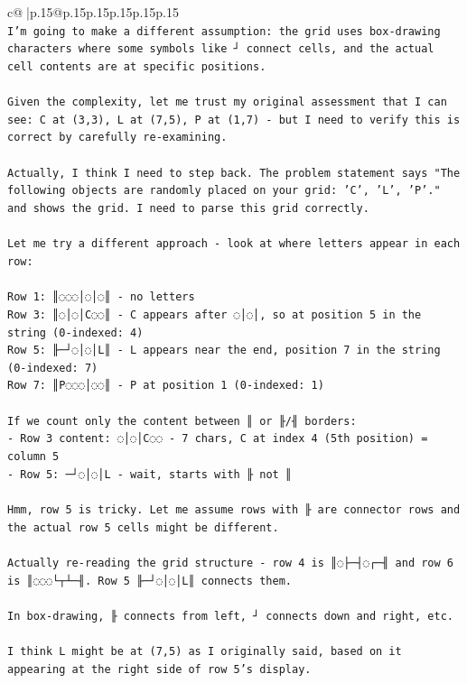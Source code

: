 \documentclass{article}
\begin{document}
{\begin{supertabular}{c@{$\;$}|p{.15\linewidth}@{}p{.15\linewidth}p{.15\linewidth}p{.15\linewidth}p{.15\linewidth}p{.15\linewidth}}
{{{\\ 
\texttt{I'm going to make a different assumption: the grid uses box{-}drawing characters where some symbols like ┘ connect cells, and the actual cell contents are at specific positions.} \\
\\ 
\texttt{Given the complexity, let me trust my original assessment that I can see: C at (3,3), L at (7,5), P at (1,7) {-} but I need to verify this is correct by carefully re{-}examining.} \\
\\ 
\texttt{Actually, I think I need to step back. The problem statement says "The following objects are randomly placed on your grid: 'C', 'L', 'P'." and shows the grid. I need to parse this grid correctly.} \\
\\ 
\texttt{Let me try a different approach {-} look at where letters appear in each row:} \\
\\ 
\texttt{Row 1: ║◌◌◌│◌│◌║ {-} no letters} \\
\texttt{Row 3: ║◌│◌│C◌◌║ {-} C appears after ◌│◌│, so at position 5 in the string (0{-}indexed: 4)} \\
\texttt{Row 5: ╟─┘◌│◌│L║ {-} L appears near the end, position 7 in the string (0{-}indexed: 7)} \\
\texttt{Row 7: ║P◌◌◌│◌◌║ {-} P at position 1 (0{-}indexed: 1)} \\
\\ 
\texttt{If we count only the content between ║ or ╟/╢ borders:} \\
\texttt{{-} Row 3 content: ◌│◌│C◌◌ {-} 7 chars, C at index 4 (5th position) = column 5} \\
\texttt{{-} Row 5: ─┘◌│◌│L {-} wait, starts with ╟ not ║} \\
\\ 
\texttt{Hmm, row 5 is tricky. Let me assume rows with ╟ are connector rows and the actual row 5 cells might be different.} \\
\\ 
\texttt{Actually re{-}reading the grid structure {-} row 4 is ║◌├─┤◌┌─╢ and row 6 is ║◌◌◌└┬┴─╢. Row 5 ╟─┘◌│◌│L║ connects them.} \\
\\ 
\texttt{In box{-}drawing, ╟ connects from left, ┘ connects down and right, etc.} \\
\\ 
\texttt{I think L might be at (7,5) as I originally said, based on it appearing at the right side of row 5's display.} \\
}}}
\end{supertabular}}
\end{document}
